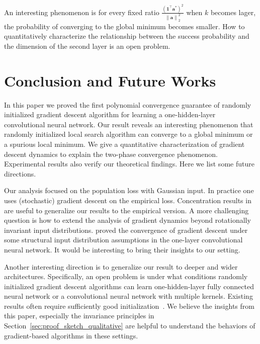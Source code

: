 \documentclass{article}
\newcommand{\secondlayer}{a}
\newcommand{\vect}[1]{\mathbf{#1}}
\newcommand{\norm}[1]{\left\|#1\right\|}
\begin{document}
An interesting phenomenon is for every fixed ratio  $\frac{(\vect{1}^\top\vect{\secondlayer}^*)^2}{\norm{\vect{\secondlayer}}_2^2}$ when $k$ becomes lager, the probability of converging to the global minimum becomes smaller.
How to quantitatively characterize  the relationship between the success probability and the dimension of the second layer is an open problem.



\section{Conclusion and Future Works}
\label{sec:con}
In this paper we proved the first polynomial convergence guarantee of randomly initialized gradient descent algorithm for learning a one-hidden-layer convolutional neural network.
Our result reveals an interesting phenomenon that randomly initialized local search algorithm can converge to a global minimum or a spurious local minimum.
We give a quantitative characterization of gradient descent dynamics to explain the two-phase convergence phenomenon.
Experimental results also verify our theoretical findings.
Here we list some future directions.

Our analysis focused on the population loss with Gaussian input.
In practice one uses (stochastic) gradient descent on the empirical loss.
Concentration results in~\citep{mei2016landscape,soltanolkotabi2017learning} are useful to generalize our results to the empirical version.
A more challenging question is how to extend the analysis of gradient dynamics beyond rotationally invariant input distributions.
\citet{du2017convolutional} proved the convergence of gradient descent under some structural input distribution assumptions in the one-layer convolutional neural network.
It would be interesting to bring their insights to our setting.

Another interesting direction is to generalize our result to deeper and wider architectures.
Specifically, an open problem is under what conditions randomly initialized gradient descent algorithms can learn one-hidden-layer fully connected neural network or a convolutional neural network with multiple kernels.
Existing results often require sufficiently good initialization~\citep{zhong2017learning,zhong2017recovery}.
We believe the insights from this paper, especially the invariance principles in Section~\ref{sec:proof_sketch_qualitative} are helpful to understand the behaviors of gradient-based algorithms in these settings.
\end{document}
